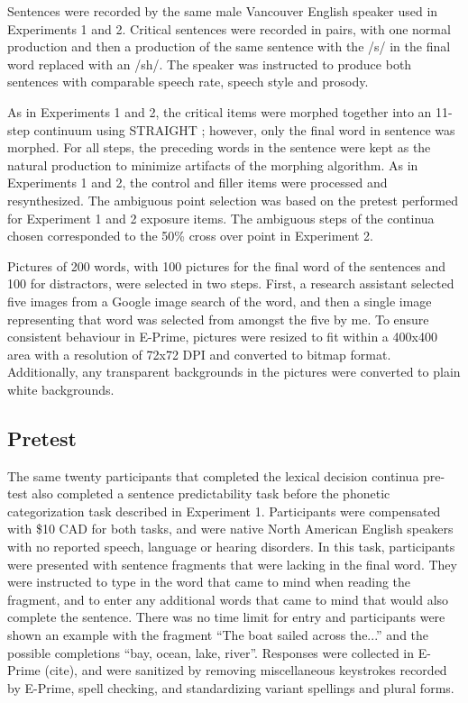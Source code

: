 Sentences were recorded by the same male Vancouver English speaker used in Experiments 1 and 2.  Critical sentences were recorded in pairs, with one normal production and then a production of the same sentence with the /s/ in the final word replaced with an /sh/.  The speaker was instructed to produce both sentences with comparable speech rate, speech style and prosody.

As in Experiments 1 and 2, the critical items were morphed together into an 11-step continuum using STRAIGHT \citep{Kawahara2008}; however, only the final word in sentence was morphed.  For all steps, the preceding words in the sentence were kept as the natural production to minimize artifacts of the morphing algorithm.  As in Experiments 1 and 2, the control and filler items were processed and resynthesized.  The ambiguous point selection was based on the pretest performed for Experiment 1 and 2 exposure items.  The ambiguous steps of the continua chosen corresponded to the 50\% cross over point in Experiment 2.

Pictures of 200 words, with 100 pictures for the final word of the sentences and 100 for distractors, were selected in two steps.  First, a research assistant selected five images from a Google image search of the word, and then a single image representing that word was selected from amongst the five by me.  To ensure consistent behaviour in E-Prime, pictures were resized to fit within a 400x400 area with a resolution of 72x72 DPI and converted to bitmap format.  Additionally, any transparent backgrounds in the pictures were converted to plain white backgrounds.

\subsection{Pretest}

The same twenty participants that completed the lexical decision continua pre-test also completed a sentence predictability task before the phonetic categorization task described in Experiment 1. Participants were compensated with \$10 CAD for both tasks, and were native North American English speakers with no reported speech, language or hearing disorders. In this task, participants were presented with sentence fragments that were lacking in the final word.  They were instructed to type in the word that came to mind when reading the fragment, and to enter any additional words that came to mind that would also complete the sentence.  There was no time limit for entry and participants were shown an example with the fragment ``The boat sailed across the...'' and the possible completions ``bay, ocean, lake, river''.  Responses were collected in E-Prime (cite), and were sanitized by removing miscellaneous keystrokes recorded by E-Prime, spell checking, and standardizing variant spellings and plural forms.

